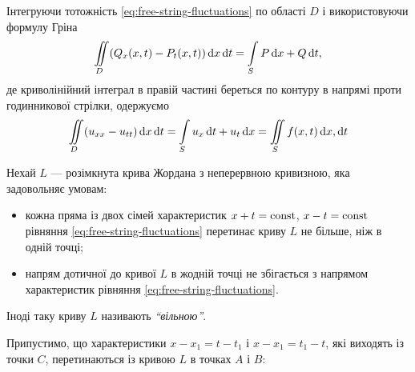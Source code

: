 Інтегруючи тотожність \eqref{eq:free-string-fluctuations} по області $D$ і використовуючи формулу Гріна
\begin{equation}
    \displaystyle\iint\limits_D (Q_x(x, t) - P_t(x, t)) \mathop{}\!\mathrm{d} x \mathop{}\!\mathrm{d} t = \displaystyle\int\limits_S P \mathop{}\!\mathrm{d} x + Q \mathop{}\!\mathrm{d} t,
\end{equation}
де криволінійний інтеграл в правій частині береться по контуру в напрямі проти годинникової стрілки, одержуємо
\begin{equation}
    \displaystyle\iint\limits_D (u_{xx} - u_{tt}) \mathop{}\!\mathrm{d} x \mathop{}\!\mathrm{d} t = \displaystyle\int\limits_S u_x \mathop{}\!\mathrm{d} t + u_t \mathop{}\!\mathrm{d} x = \displaystyle\iint\limits_S f(x, t) \mathop{}\!\mathrm{d} x, \mathop{}\!\mathrm{d} t
\end{equation}

Нехай $L$ --- розімкнута крива Жордана з неперервною кривизною, яка задовольняє умовам:
\begin{itemize}
    \item кожна пряма із двох сімей характеристик $x + t = \operatorname{const}$, $x - t = \operatorname{const}$рівняння \eqref{eq:free-string-fluctuations} перетинає криву $L$ не більше, ніж в одній точці;
    \item напрям дотичної до кривої $L$ в жодній точці не збігається з напрямом характеристик рівняння \eqref{eq:free-string-fluctuations}.
\end{itemize}

\begin{remark}
    Іноді таку криву $L$ називають \textit{``вільною''}.
\end{remark}

Припустимо, що характеристики $x - x_1 = t - t_1$ і $x - x_1 = t_1 - t$, які виходять із точки $C$, перетинаються із кривою $L$ в точках $A$ і $B$:

